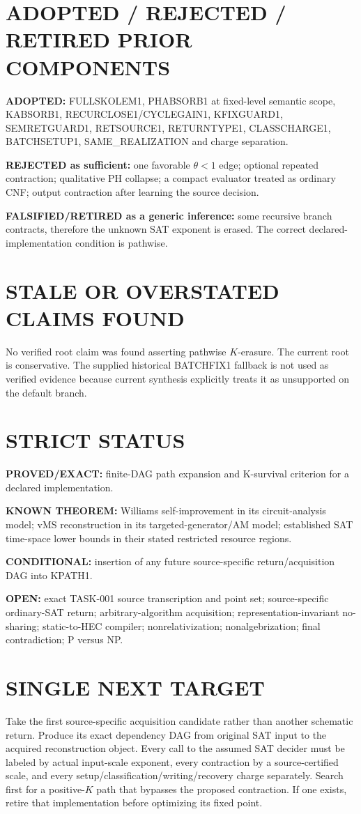 \documentclass[11pt]{article}
\begin{document}
\section*{ADOPTED / REJECTED / RETIRED PRIOR COMPONENTS}
\textbf{ADOPTED:} FULLSKOLEM1, PHABSORB1 at fixed-level semantic scope, KABSORB1, RECURCLOSE1/CYCLEGAIN1, KFIXGUARD1, SEMRETGUARD1, RETSOURCE1, RETURNTYPE1, CLASSCHARGE1, BATCHSETUP1, SAME\_REALIZATION and charge separation.

\textbf{REJECTED as sufficient:} one favorable \(\theta<1\) edge; optional repeated contraction; qualitative PH collapse; a compact evaluator treated as ordinary CNF; output contraction after learning the source decision.

\textbf{FALSIFIED/RETIRED as a generic inference:} some recursive branch contracts, therefore the unknown SAT exponent is erased. The correct declared-implementation condition is pathwise.

\section*{STALE OR OVERSTATED CLAIMS FOUND}
No verified root claim was found asserting pathwise \(K\)-erasure. The current root is conservative. The supplied historical BATCHFIX1 fallback is not used as verified evidence because current synthesis explicitly treats it as unsupported on the default branch.

\section*{STRICT STATUS}
\textbf{PROVED/EXACT:} finite-DAG path expansion and K-survival criterion for a declared implementation.

\textbf{KNOWN THEOREM:} Williams self-improvement in its circuit-analysis model; vMS reconstruction in its targeted-generator/AM model; established SAT time-space lower bounds in their stated restricted resource regions.

\textbf{CONDITIONAL:} insertion of any future source-specific return/acquisition DAG into KPATH1.

\textbf{OPEN:} exact TASK-001 source transcription and point set; source-specific ordinary-SAT return; arbitrary-algorithm acquisition; representation-invariant no-sharing; static-to-HEC compiler; nonrelativization; nonalgebrization; final contradiction; P versus NP.

\section*{SINGLE NEXT TARGET}
Take the first source-specific acquisition candidate rather than another schematic return. Produce its exact dependency DAG from original SAT input to the acquired reconstruction object. Every call to the assumed SAT decider must be labeled by actual input-scale exponent, every contraction by a source-certified scale, and every setup/classification/writing/recovery charge separately. Search first for a positive-\(K\) path that bypasses the proposed contraction. If one exists, retire that implementation before optimizing its fixed point.
\end{document}

